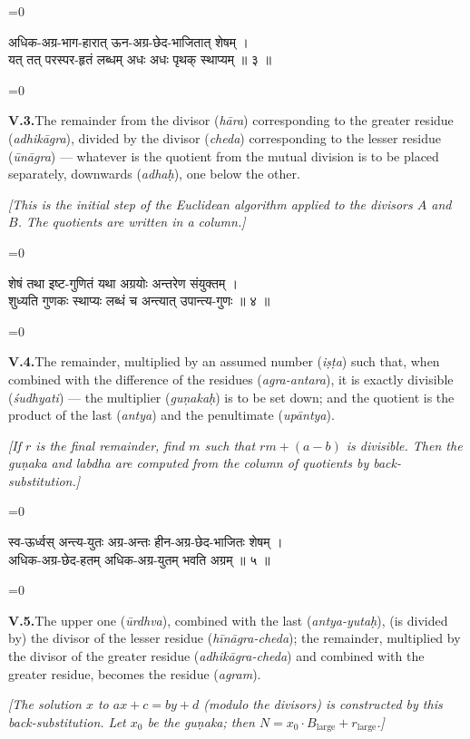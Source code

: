 \documentclass[11pt,a4paper]{article}
\newcommand{\dev}[1]{{\devanagarifont\color{sktcolor}#1}}
\newcommand{\iast}[1]{\textit{#1}}
\newenvironment{paracol}[1]{\begingroup}{\endgroup}
\newcommand{\switchcolumn}[1][]{%
  \ifnum#1=0\relax\else\par\nobreak\vspace{0.5em}\par\nobreak\fi%
}
\begin{document}
\vspace{0.3cm}

\begin{paracol}{2}
\switchcolumn[0]
\dev{%
अधिक-अग्र-भाग-हारात् ऊन-अग्र-छेद-भाजितात् शेषम् ।\\
यत् तत् परस्पर-हृतं लब्धम् अधः अधः पृथक् स्थाप्यम् ॥ ३ ॥
}

\switchcolumn[1]
\textbf{V.3.}\quad The remainder from the divisor (\iast{hāra})
corresponding to the greater residue (\iast{adhikāgra}), divided by
the divisor (\iast{cheda}) corresponding to the lesser residue
(\iast{ūnāgra}) — whatever is the quotient from the mutual division
is to be placed separately, downwards (\iast{adhaḥ}), one below the
other.

\medskip
\textit{[This is the initial step of the Euclidean algorithm applied
to the divisors $A$ and $B$. The quotients are written in a column.]}
\end{paracol}

\vspace{0.3cm}

\begin{paracol}{2}
\switchcolumn[0]
\dev{%
शेषं तथा इष्ट-गुणितं यथा अग्रयोः अन्तरेण संयुक्तम् ।\\
शुध्यति गुणकः स्थाप्यः लब्धं च अन्त्यात् उपान्त्य-गुणः ॥ ४ ॥
}

\switchcolumn[1]
\textbf{V.4.}\quad The remainder, multiplied by an assumed number
(\iast{iṣṭa}) such that, when combined with the difference of the
residues (\iast{agra-antara}), it is exactly divisible (\iast{śudhyati})
— the multiplier (\iast{guṇakaḥ}) is to be set down; and the
quotient is the product of the last (\iast{antya}) and the
penultimate (\iast{upāntya}).

\medskip
\textit{[If $r$ is the final remainder, find $m$ such that $rm + (a-b)$
is divisible. Then the \iast{guṇaka} and \iast{labdha} are computed
from the column of quotients by back-substitution.]}
\end{paracol}

\vspace{0.3cm}

\begin{paracol}{2}
\switchcolumn[0]
\dev{%
स्व-ऊर्ध्वस् अन्त्य-युतः अग्र-अन्तः हीन-अग्र-छेद-भाजितः शेषम् ।\\
अधिक-अग्र-छेद-हतम् अधिक-अग्र-युतम् भवति अग्रम् ॥ ५ ॥
}

\switchcolumn[1]
\textbf{V.5.}\quad The upper one (\iast{ūrdhva}), combined with the
last (\iast{antya-yutaḥ}), (is divided by) the divisor of the lesser
residue (\iast{hīnāgra-cheda}); the remainder, multiplied by the
divisor of the greater residue (\iast{adhikāgra-cheda}) and combined
with the greater residue, becomes the residue (\iast{agram}).

\medskip
\textit{[The solution $x$ to $ax + c = by + d$ (modulo the divisors)
is constructed by this back-substitution. Let $x_0$ be the
\iast{guṇaka}; then $N = x_0 \cdot B_{\text{large}} + r_{\text{large}}$.]}
\end{paracol}
\end{document}
